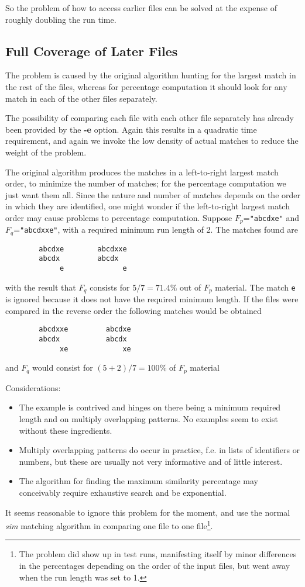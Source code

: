 \documentclass[a4paper,fleqn]{article}
\renewcommand{\sim}[0]{{\it sim}}
\newcommand{\bd}[1]{\textbf{#1}}
\newcommand{\cw}[1]{\texttt{#1}}
\begin{document}
So the problem of how to access earlier files can be solved at the expense of
roughly doubling the run time.

\subsection{Full Coverage of Later Files}

The problem is caused by the original algorithm hunting for the largest match
in the rest of the files, whereas for percentage computation it should look
for any match in each of the other files separately.

The possibility of comparing each file with each other file separately has
already been provided by the \bd{-e} option.
Again this results in a quadratic time requirement, and again we invoke the
low density of actual matches to reduce the weight of the problem.

The original algorithm produces the matches in a left-to-right largest match
order, to minimize the number of matches; for the percentage computation we
just want them all.
Since the nature and number of matches depends on the order in which they
are identified, one might wonder if the left-to-right largest match order may
cause problems to percentage computation.
Suppose $F_p$=\cw{"abcdxe"} and $F_q$=\cw{"abcdxxe"}, with a required
minimum run length of 2.
The matches found are
\begin{verbatim}
        abcdxe        abcdxxe
        abcdx         abcdx
             e              e
\end{verbatim}
with the result that $F_q$ consists for $5/7 = 71.4\%$ out of $F_p$ material.
The match \cw{e} is ignored because it does not have the required minimum
length.
If the files were compared in the reverse order the following matches would be
obtained
\begin{verbatim}
        abcdxxe         abcdxe
        abcdx           abcdx
             xe             xe
\end{verbatim}
and $F_q$ would consist for $(5+2)/7 = 100\%$ of $F_p$ material

Considerations:
\begin{itemize}
\item
The example is contrived and hinges on there being a minimum required length
and on multiply overlapping patterns.
No examples seem to exist without these ingredients.
\item
Multiply overlapping patterns do occur in practice, f.e. in lists of
identifiers or numbers, but these are usually not very informative and of
little interest.
\item
The algorithm for finding the maximum similarity percentage may conceivably 
require exhaustive search and be exponential.
\end{itemize}
It seems reasonable to ignore this problem for the moment, and use the normal
{\sim} matching algorithm in comparing one file to one file\footnote{%
The problem did show up in test runs, manifesting itself by minor differences
in the percentages depending on the order of the input files, but went away
when the run length was set to 1.}.
\end{document}
